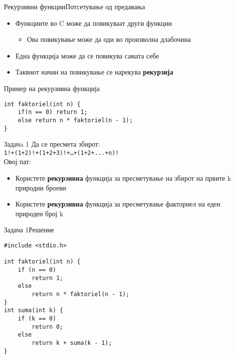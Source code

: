 


\begin{frame}[fragile]{Рекурзивни функции}{Потсетување од предавања}
\begin{itemize}
    \item Функциите во C може да повикуваат други функции
    \begin{itemize}
        \item Ова повикување може да оди во произволна длабочина
    \end{itemize}    
    \item Една функција може да се повикува самата себе
    \item Таквиот начин на повикување се нарекува \textbf{рекурзија}    
\end{itemize}
\begin{exampleblock}{Пример на рекурзивна функција}
\begin{lstlisting}
int faktoriel(int n) {
    if(n == 0) return 1;
    else return n * faktoriel(n - 1);
}
\end{lstlisting}
\end{exampleblock}
\end{frame}

\begin{frame}{Задачa 1}
Да се пресмета збирот:\\
\texttt{1!+(1+2)!+(1+2+3)!+\ldots+(1+2+...+n)!}
\\Овој пат:\\
\begin{itemize}
    \item Користете \textbf{рекурзивна} функција за пресметување на збирот на првите k
    природни броеви
    \item Користете \textbf{рекурзивна} функција за пресметување факториел на еден
    природен број k
\end{itemize}
\end{frame}

\begin{frame}[fragile]{Задача 1}{Решение}
\begin{lstlisting}
#include <stdio.h>

int faktoriel(int n) {
    if (n == 0)
        return 1;
    else
        return n * faktoriel(n - 1);
}
int suma(int k) {
    if (k == 0)
        return 0;
    else
        return k + suma(k - 1);
}
\end{lstlisting}
\end{frame}

